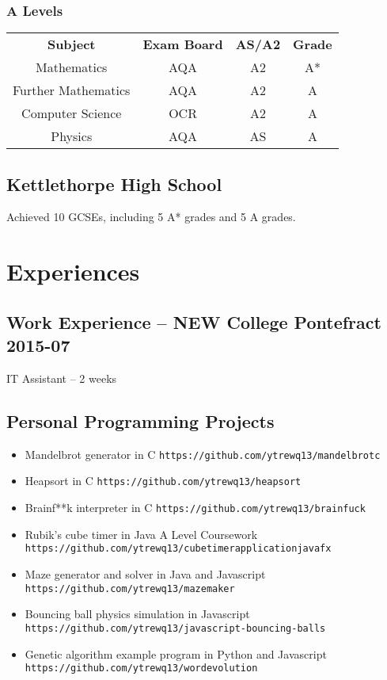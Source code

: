 \documentclass[9pt]{extarticle}
\begin{document}
    \subsubsection{A Levels}
    \begin{tabular}{cccc}
        \textbf{Subject} & \textbf{Exam Board} & \textbf{AS/A2} & \textbf{Grade} \\
        Mathematics & AQA & A2 & A* \\
        Further Mathematics & AQA & A2 & A \\
        Computer Science & OCR & A2 & A \\
        Physics & AQA & AS & A
    \end{tabular}
      \subsection{Kettlethorpe High School}
    Achieved 10 GCSEs, including 5 A* grades and 5 A grades.
    \section{Experiences}
    \subsection{Work Experience -- NEW College Pontefract
    \hfill 2015-07}
    IT Assistant
    --
    2 weeks
    \subsection{Personal Programming Projects}
    \begin{itemize}
        \item Mandelbrot generator in C
            \hfill
            \texttt{https://github.com/ytrewq13/mandelbrotc}
        \item Heapsort in C
            \hfill
            \texttt{https://github.com/ytrewq13/heapsort}
        \item Brainf**k interpreter in C
            \hfill
            \texttt{https://github.com/ytrewq13/brainfuck}
        \item Rubik's cube timer in Java
            \hfill
            A Level Coursework
            \hfill
            \texttt{https://github.com/ytrewq13/cubetimerapplicationjavafx}
        \item Maze generator and solver in Java and Javascript
            \hfill
            \texttt{https://github.com/ytrewq13/mazemaker}
        \item Bouncing ball physics simulation in Javascript
            \hfill
            \texttt{https://github.com/ytrewq13/javascript-bouncing-balls}
        \item Genetic algorithm example program in Python and Javascript
            \hfill
            \texttt{https://github.com/ytrewq13/wordevolution}
    \end{itemize}
\end{document}
